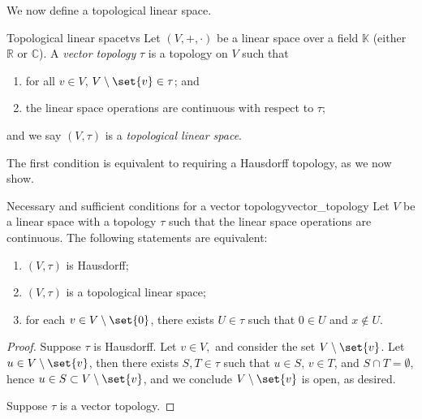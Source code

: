 We now define a topological linear space.
\begin{definition}{Topological linear space}{tvs}
    Let \((V, +, \cdot)\) be a linear space over a field \(\mathbb{K}\) (either \(\mathbb{R}\) or \(\mathbb{C}\)). A \emph{vector topology} \(\tau\) is a topology on \(V\) such that
    \begin{enumerate}[label=(\alph*)]
        \item for all \(v \in V\), \(V \setminus \set{v} \in \tau\); and
        \item the linear space operations are continuous with respect to \(\tau\);
    \end{enumerate}
    and we say \((V, \tau)\) is a \emph{topological linear space}.
\end{definition}
The first condition is equivalent to requiring a Hausdorff topology, as we now show.
\begin{proposition}{Necessary and sufficient conditions for a vector topology}{vector_topology}
    Let \(V\) be a linear space with a topology \(\tau\) such that the linear space operations are continuous. The following statements are equivalent:
    \begin{enumerate}[label=(\alph*)]
        \item \((V, \tau)\) is Hausdorff;
        \item \((V, \tau)\) is a topological linear space;
        \item for each \(v \in V \setminus\set{0}\), there exists \(U \in \tau\) such that \(0 \in U\) and \(x \notin U\).
    \end{enumerate}
\end{proposition}
\begin{proof}
    Suppose \(\tau\) is Hausdorff. Let \(v \in V,\) and consider the set \(V \setminus \set{v}\). Let \(u \in V\setminus \set{v}\), then there exists \(S, T \in \tau\) such that \(u \in S\), \(v \in T\), and \(S \cap T = \emptyset\), hence \(u \in S \subset V \setminus \set{v}\), and we conclude \(V \setminus \set{v}\) is open, as desired.

    Suppose \(\tau\) is a vector topology. 
\end{proof}

